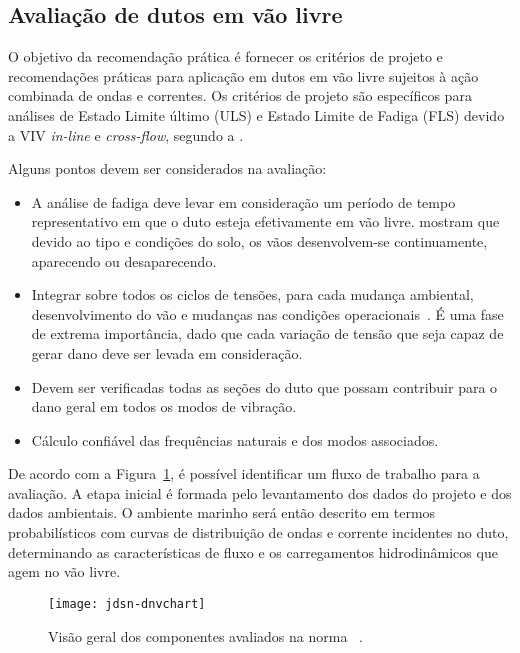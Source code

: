 \subsection{Avaliação de dutos em vão livre}

O objetivo da recomendação prática  é fornecer os critérios de projeto e recomendações práticas para aplicação em dutos em vão livre sujeitos à ação combinada de ondas e correntes. Os critérios de projeto são específicos para análises de Estado Limite último (ULS) e Estado Limite de Fadiga (FLS) devido a VIV \textit{in-line} e \textit{cross-flow}, segundo a .  

Alguns pontos devem ser considerados na avaliação:
\begin{itemize}
\item A análise de fadiga deve levar em consideração um período de tempo representativo em que o duto esteja efetivamente em vão livre. \citet{Fyrileiv1998} mostram que devido ao tipo e condições do solo, os vãos desenvolvem-se continuamente, aparecendo ou desaparecendo.

\item Integrar sobre todos os ciclos de tensões, para cada mudança ambiental, desenvolvimento do vão e mudanças nas condições operacionais~\cite{Mork1999}. É uma fase de extrema importância, dado que cada variação de tensão que seja capaz de gerar dano deve ser levada em consideração.

\item Devem ser verificadas todas as seções do duto que possam contribuir para o dano geral em todos os modos de vibração.

\item Cálculo confiável das frequências naturais e dos modos associados.
\end{itemize}

De acordo com a Figura~\ref{fig:jdsn-dnvchart}, é possível identificar um fluxo de trabalho para a avaliação. A etapa inicial é formada pelo levantamento dos dados do projeto e dos dados ambientais. O ambiente marinho será então descrito em termos probabilísticos com curvas de distribuição de ondas e corrente incidentes no duto, determinando as características de fluxo e os carregamentos hidrodinâmicos que agem no vão livre.

\begin{figure}[hbt!]
\begin{center}
\texttt{[image: jdsn-dnvchart]}
\caption{Visão geral dos componentes avaliados na norma ~\cite{DNV2017}.}
\label{fig:jdsn-dnvchart} 
\end{center}
\end{figure}

